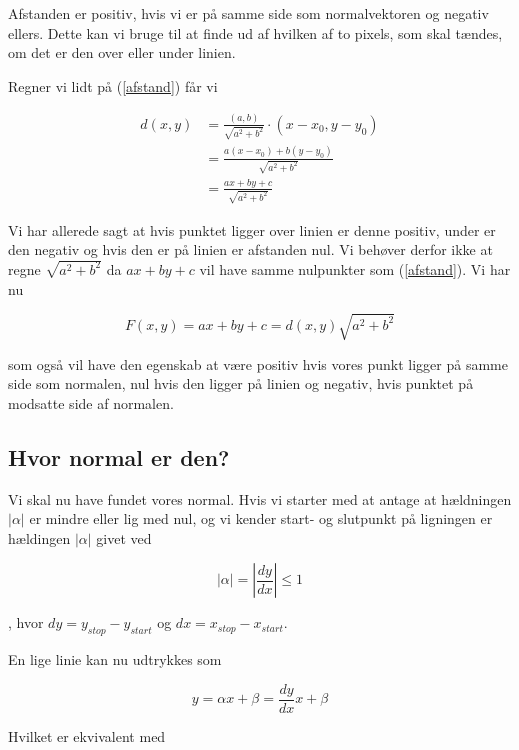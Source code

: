 \documentclass[a4paper, 10pt]{article}
\begin{document}
Afstanden er positiv, hvis vi er på samme side som normalvektoren og negativ ellers.
Dette kan vi bruge til at finde ud af hvilken af to pixels, som skal tændes, om det er den over eller under linien.

Regner vi lidt på (\ref{afstand}) får vi 

\begin{align}
d(x,y) &= \frac{(a,b)}{\sqrt{a^2 + b^2}} \cdot (x-x_0, y-y_0) \nonumber\\
       &= \frac{a(x - x_0) + b(y - y_0)}{\sqrt{a^2 + b^2}} \nonumber\\
       &= \frac{ax + by + c}{\sqrt{a^2 + b^2}} \nonumber
\end{align}

Vi har allerede sagt at hvis punktet ligger over linien er denne positiv, under er den negativ og hvis den er på linien er afstanden nul.
Vi behøver derfor ikke at regne $\sqrt{a^2 + b^2}$ da $ax + by +c$ vil have samme nulpunkter som (\ref{afstand}).
Vi har nu

\begin{equation}
F(x,y) = ax + by + c = d(x,y) \sqrt{a^2 + b^2} \label{normafstand}
\end{equation}

som også vil have den egenskab at være positiv hvis vores punkt ligger på samme side som normalen, nul hvis den ligger på linien og negativ, hvis punktet på modsatte side af normalen.

\subsection{Hvor normal er den?}
Vi skal nu have fundet vores normal.
Hvis vi starter med at antage at hældningen $|\alpha|$ er mindre eller lig med nul, og vi kender start- og slutpunkt på ligningen er hældingen $|\alpha|$ givet ved

\begin{equation}
|\alpha| = |\frac{dy}{dx}| \leq 1 \nonumber
\end{equation}

, hvor $dy = y_{stop} - y_{start}$ og $dx = x_{stop} - x_{start}$.

En lige linie kan nu udtrykkes som

\begin{equation}
y = \alpha x + \beta = \frac{dy}{dx}x + \beta \nonumber
\end{equation}

Hvilket er ekvivalent med 
\end{document}
